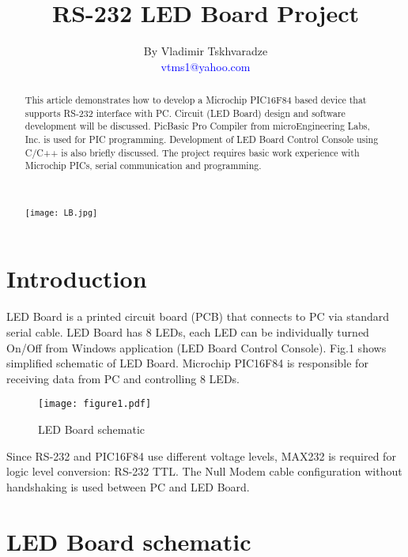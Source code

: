 \documentclass{article}
\begin{document}
\title{RS-232 LED Board Project}
\author{By Vladimir Tskhvaradze \\ \textcolor{blue}{\small{vtms1@yahoo.com}}}
\maketitle

\begin{abstract}
This article demonstrates how to develop a Microchip PIC16F84 based
device that supports RS-232 interface with PC. Circuit (LED Board)
design and software development will be discussed. PicBasic Pro
Compiler from microEngineering Labs, Inc. is used for PIC
programming. Development of LED Board Control Console using C/C++ is
also briefly discussed. The project requires basic work experience
with Microchip PICs, serial communication and programming.
\\
\\
\\
\begin{center}
\texttt{[image: LB.jpg]}
\end{center}
\end{abstract}

\thispagestyle{empty}

\newpage

\section{Introduction}

LED Board is a printed circuit board (PCB) that connects to PC via
standard serial cable. LED Board has 8 LEDs, each LED can be
individually turned On/Off from Windows application (LED Board
Control Console). Fig.1 shows simplified schematic of LED Board.
Microchip PIC16F84 is responsible for receiving data from PC and
controlling 8 LEDs.

\makeatletter
\def\fps@figure{h}
\makeatother

\begin{figure}
\centering
\texttt{[image: figure1.pdf]}
\caption{LED Board schematic} \label{fig:graph}
\end{figure}
Since RS-232 and PIC16F84 use different voltage levels, MAX232 is
required for logic level conversion: RS-232 
TTL. The Null Modem cable configuration without handshaking is used
between PC and LED Board.

\newpage
\section{LED Board schematic}
\end{document}
